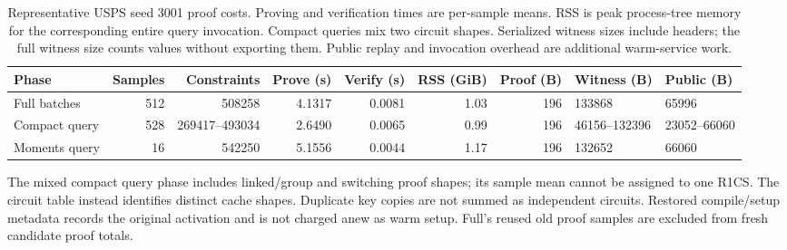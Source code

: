 \documentclass[5p,times,twocolumn]{elsarticle}
\begin{document}
\begin{table}[H]
\centering\small
\caption{Representative USPS seed 3001 proof costs. Proving and verification times are per-sample means. RSS is peak process-tree memory for the corresponding entire query invocation. Compact queries mix two circuit shapes. Serialized witness sizes include headers; the full witness size counts values without exporting them. Public replay and invocation overhead are additional warm-service work.}
\label{tab:final-proof-phases}
\begin{tabular}{@{}lrrrrrrll@{}}\toprule
Phase & Samples & Constraints & Prove (s) & Verify (s) & RSS (GiB) & Proof (B) & Witness (B) & Public (B)\\
\midrule
Full batches & 512 & 508258 & 4.1317 & 0.0081 & 1.03 & 196 & 133868 & 65996\\
Compact query & 528 & 269417--493034 & 2.6490 & 0.0065 & 0.99 & 196 & 46156--132396 & 23052--66060\\
Moments query & 16 & 542250 & 5.1556 & 0.0044 & 1.17 & 196 & 132652 & 66060\\
\bottomrule
\end{tabular}
\end{table}

The mixed compact query phase includes linked/group and switching proof
shapes; its sample mean cannot be assigned to one R1CS. The circuit table
instead identifies distinct cache shapes. Duplicate key copies are not
summed as independent circuits. Restored compile/setup metadata records
the original activation and is not charged anew as warm setup. Full's
reused old proof samples are excluded from fresh candidate proof totals.
\end{document}
